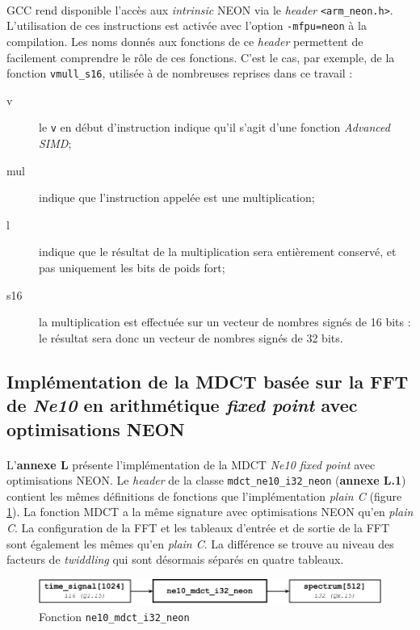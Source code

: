 \documentclass{article}
\begin{document}
    \paragraph{}
    GCC rend disponible l'accès aux \emph{intrinsic} NEON via le \emph{header} \texttt{<arm\_neon.h>}\cite{NEON-list}. L'utilisation de ces instructions est activée avec l'option \texttt{-mfpu=neon} à la compilation. Les noms donnés aux fonctions de ce \emph{header} permettent de facilement comprendre le rôle de ces fonctions. C'est le cas, par exemple, de la fonction \texttt{vmull\_s16}, utilisée à de nombreuses reprises dans ce travail :
    \begin{description}
        \item[v] le \texttt{v} en début d'instruction indique qu'il s'agit d'une fonction \emph{Advanced SIMD};
        \item[mul] indique que l'instruction appelée est une multiplication;
        \item[l] indique que le résultat de la multiplication sera entièrement conservé, et pas uniquement les bits de poids fort;
        \item[s16] la multiplication est effectuée sur un vecteur de nombres signés de 16 bits : le résultat sera donc un vecteur de nombres signés de 32 bits.
    \end{description}


    \subsection{Implémentation de la MDCT basée sur la FFT de \emph{Ne10} en arithmétique \emph{fixed point} avec optimisations NEON}

    \paragraph{}
    L'\textbf{annexe L} présente l'implémentation de la MDCT \emph{Ne10 fixed point} avec optimisations NEON. Le \emph{header} de la classe \texttt{mdct\_ne10\_i32\_neon} (\textbf{annexe L.1}) contient les mêmes définitions de fonctions que l'implémentation \emph{plain C} (figure \ref{fig:func_ne10_mdct_i32_neon}). La fonction MDCT a la même signature avec optimisations NEON qu'en \emph{plain C}. La configuration de la FFT et les tableaux d'entrée et de sortie de la FFT sont également les mêmes qu'en \emph{plain C}. La différence se trouve au niveau des facteurs de \emph{twiddling} qui sont désormais séparés en quatre tableaux.
    \begin{figure}[H]
        \centering
        \includegraphics[width=.8\linewidth]{./images/func_ne10_mdct_i32_neon.pdf}
        \caption{Fonction \texttt{ne10\_mdct\_i32\_neon}}
        \label{fig:func_ne10_mdct_i32_neon}
    \end{figure}
\end{document}
